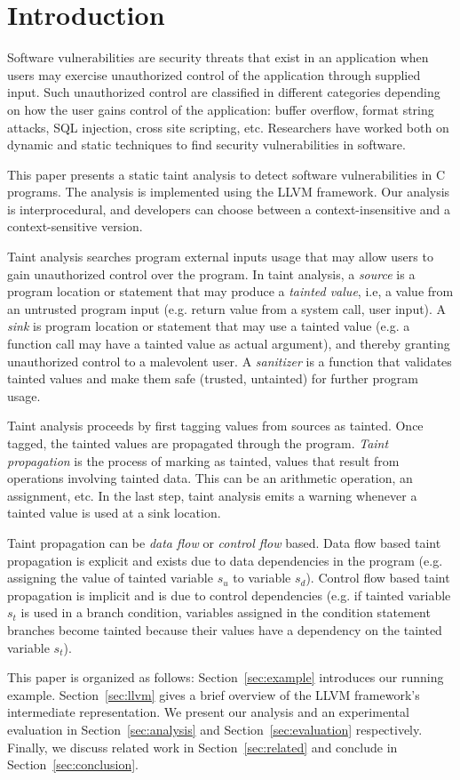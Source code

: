 \section{Introduction}
Software vulnerabilities are security threats
that exist in an application when users may exercise
unauthorized  control of the application through supplied input.
Such unauthorized control are classified in different
categories depending on how the user gains control of
the application: buffer overflow, format string attacks,
SQL injection, cross site scripting, etc.
Researchers have worked both on dynamic \cite{Clause:2007:Dytan,
Kiezun:2009:Ardilla} and static techniques 
\cite{Jovanovic:2006:Pixy, Shankar:2001:DFS, livshits05finding, 
Avots:2005:ISS, Dimitru:2009:STAC, Tripp:2009:TET} to find 
security vulnerabilities in software. 

This paper presents a static taint analysis to detect software
vulnerabilities in C programs. The analysis is implemented
using the LLVM framework\cite{Lattner:2004:LLVM}. Our analysis
is interprocedural, and developers can choose between a
context-insensitive and a context-sensitive version. 

Taint analysis searches program external inputs usage that
may allow users to gain unauthorized control over the program. 
In taint analysis, a \textit{source} is a program location
or statement that may produce a \textit{tainted value}, i.e,
a value from an untrusted program input (e.g. return value from a
system call, user input). 
A \textit{sink} is program location or statement that may use
a tainted value (e.g. a function call may have a tainted value as
actual argument), and thereby granting unauthorized control
to a malevolent user.
A \textit{sanitizer} is a function that validates tainted
values and make them safe (trusted, untainted) for further
program usage.

Taint analysis proceeds by first tagging values from sources
as tainted. Once tagged, the tainted values are propagated
through the program.
\textit{Taint propagation} is the process of marking as tainted, 
values that result from operations involving tainted data. This
can be an arithmetic operation, an assignment, etc. In the
last step, taint analysis emits a warning whenever a tainted
value is used at a sink location.

Taint propagation can be \textit{data flow} or \textit{control flow}
based. Data flow based taint propagation is explicit and exists
due to data dependencies in the program (e.g. assigning the value
of tainted variable $s_u$ to variable $s_d$).
Control flow based taint propagation is implicit and is due to
control dependencies (e.g. if tainted variable $s_t$ is used in a branch
condition, variables assigned in the condition statement branches
become tainted because their values have a dependency on the
tainted variable $s_t$).

This paper is organized as follows: Section~\ref{sec:example}
introduces our running example. Section~\ref{sec:llvm} gives
a brief overview of the LLVM framework's intermediate
representation. We present our analysis and an experimental
evaluation in Section~\ref{sec:analysis} and Section~\ref{sec:evaluation}
respectively. Finally, we discuss related work in Section~\ref{sec:related}
and conclude in Section~\ref{sec:conclusion}.